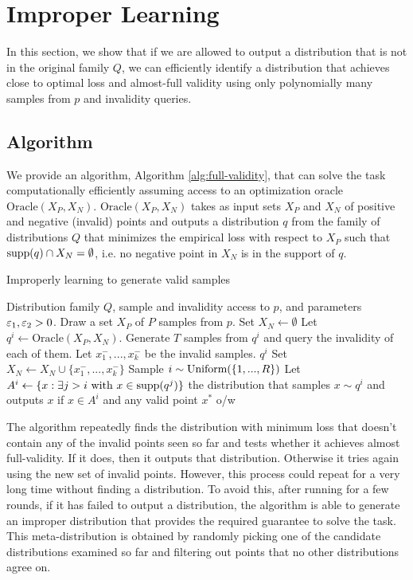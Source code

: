 \section{Improper Learning}
\label{sec:improper}

In this section, we show that if we are allowed to output a distribution that is not in the original family $Q$, we can efficiently identify a distribution that achieves close to optimal loss and almost-full validity using only polynomially many samples from $p$ and invalidity queries.

\subsection{Algorithm}

We provide an algorithm, Algorithm \ref{alg:full-validity}, that can solve the task computationally efficiently assuming access to an optimization oracle $\text{Oracle}(X_P,X_N)$. $\text{Oracle}(X_P,X_N)$ takes as input sets $X_P$ and $X_N$ of positive and negative (invalid) points and outputs a distribution $q$ from the family of distributions $Q$ that minimizes the empirical loss with respect to $X_P$ such that $\text{supp}(q) \cap X_N = \emptyset$, i.e. no negative point in $X_N$ is in the support of $q$.

\begin{algorithm}[ht]
   \caption{Improperly learning to generate valid samples}
   \label{alg:full-validity}
\begin{algorithmic}[1]
    Distribution family $Q$, sample and invalidity access to $p$, and parameters $\varepsilon_1, \varepsilon_2 > 0$.
   \STATE Draw a set $X_P$ of $P$ samples from $p$.
   \STATE Set $X_N \leftarrow \emptyset$
     \STATE Let $q^i \leftarrow \text{Oracle}(X_P,X_N)$.
     \STATE Generate $T$ samples from $q^i$ and query the invalidity of each of them.
     \STATE Let $x^-_1,...,x^-_k$ be the invalid samples.
        \RETURN $q^i$
     \ELSE
       \STATE Set $X_N \leftarrow X_N \cup \{x^-_1,...,x^-_k\}$
     \ENDIF
   \ENDFOR
   \STATE Sample $i \sim \text{Uniform}(\{1,...,R\})$
   \STATE Let $A^i \leftarrow {\{x: \exists j > i \text{ with } x \in \text{supp}(q^j)\}}$
   \RETURN the distribution that samples $x \sim q^i$ and outputs $x$ if $x \in A^i$ and any valid point $x^*$ o/w
\end{algorithmic}
\end{algorithm}

The algorithm repeatedly finds the distribution with minimum loss that doesn't contain any of the invalid points seen so far and tests whether it achieves almost full-validity. If it does, then it outputs that distribution. Otherwise it tries again using the new set of invalid points. However, this process could repeat for a very long time without finding a distribution. To avoid this, after running for a few rounds, if it has failed to output a distribution, the algorithm is able to generate an improper distribution that provides the required guarantee to solve the task. This meta-distribution is obtained by randomly picking one of the candidate distributions examined so far and filtering out points that no other distributions agree on.

